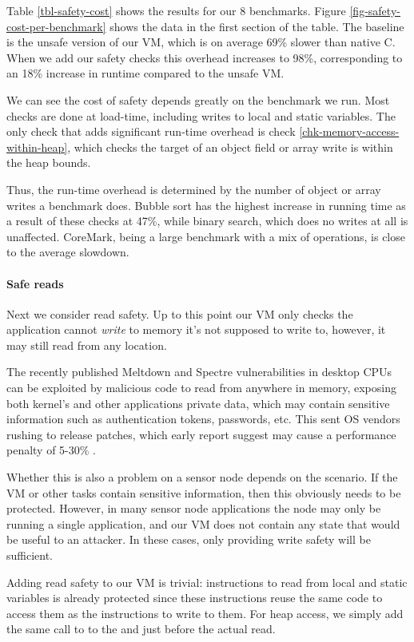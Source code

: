 Table \ref{tbl-safety-cost} shows the results for our 8 benchmarks. Figure \ref{fig-safety-cost-per-benchmark} shows the data in the first section of the table. The baseline is the unsafe version of our VM, which is on average 69\% slower than native C. When we add our safety checks this overhead increases to 98\%, corresponding to an 18\% increase in runtime compared to the unsafe VM.

We can see the cost of safety depends greatly on the benchmark we run. Most checks are done at load-time, including writes to local and static variables. The only check that adds significant run-time overhead is check \ref{chk-memory-access-within-heap}, which checks the target of an object field or array write is within the heap bounds.

Thus, the run-time overhead is determined by the number of object or array writes a benchmark does. Bubble sort has the highest increase in running time as a result of these checks at 47\%, while binary search, which does no writes at all is unaffected. CoreMark, being a large benchmark with a mix of operations, is close to the average slowdown.

\paragraph{Safe reads}
Next we consider read safety. Up to this point our VM only checks the application cannot \emph{write} to memory it's not supposed to write to, however, it may still read from any location.

The recently published Meltdown and Spectre vulnerabilities in desktop CPUs can be exploited by malicious code to read from anywhere in memory, exposing both kernel's and other applications private data, which may contain sensitive information such as authentication tokens, passwords, etc. This sent OS vendors rushing to release patches, which early report suggest may cause a performance penalty of 5-30\% \cite{register-spectre-meltdown}.

Whether this is also a problem on a sensor node depends on the scenario. If the VM or other tasks contain sensitive information, then this obviously needs to be protected. However, in many sensor node applications the node may only be running a single application, and our VM does not contain any state that would be useful to an attacker. In these cases, only providing write safety will be sufficient.

Adding read safety to our VM is trivial: instructions to read from local and static variables is already protected since these instructions reuse the same code to access them as the instructions to write to them. For heap access, we simply add the same call to  to the  and  just before the actual read.

